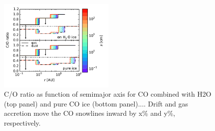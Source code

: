 \documentclass[apj]{emulateapj}
\newcommand{\emgr}[1]{\emph{ \color{gray} #1}}
\begin{document}


\begin{figure}[h!]
\centering
\includegraphics[width=0.5\textwidth]{../../figs/C_O_water_ice.pdf}
\caption{C/O ratio as function of semimajor axis for CO combined with H2O (top panel) and pure CO ice (bottom panel).... Drift and gas accretion move the CO snowlines inward by x\% and y\%, respectively.} 
\label{fig:CO_ratio}
\end{figure}
\end{document}
